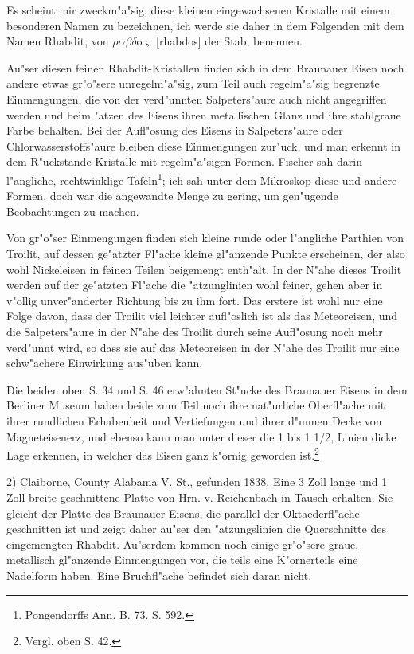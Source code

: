 \documentclass[a4paper, 11pt, oneside]{article}
\begin{document}
Es scheint mir zweckm"a"sig, diese kleinen eingewachsenen Kristalle mit einem besonderen Namen zu bezeichnen, ich werde sie daher in dem Folgenden mit dem Namen Rhabdit, von $\rho\alpha\beta\delta$o$\varsigma$ [rhabdos] der Stab, benennen.

Au"ser diesen feinen Rhabdit-Kristallen finden sich in dem Braunauer Eisen noch andere etwas gr"o"sere unregelm"a"sig, zum Teil auch regelm"a"sig begrenzte Einmengungen, die von der verd"unnten Salpeters"aure auch nicht angegriffen werden und beim "atzen des Eisens ihren metallischen Glanz und ihre stahlgraue Farbe behalten. Bei der Aufl"osung des Eisens in Salpeters"aure oder Chlorwasserstoffs"aure bleiben diese Einmengungen zur"uck, und man erkennt in dem R"uckstande Kristalle mit regelm"a"sigen Formen. Fischer sah darin l"angliche, rechtwinklige Tafeln\footnote{Pongendorffs Ann. B. 73. S. 592.}; ich sah unter dem Mikroskop diese und andere Formen, doch war die angewandte Menge zu gering, um gen"ugende Beobachtungen zu machen.

Von gr"o"ser Einmengungen finden sich kleine runde oder l"angliche Parthien von Troilit, auf dessen ge"atzter Fl"ache kleine gl"anzende Punkte erscheinen, der also wohl Nickeleisen in feinen Teilen beigemengt enth"alt. In der N"ahe dieses Troilit werden auf der ge"atzten Fl"ache die "atzunglinien wohl feiner, gehen aber in v"ollig unver"anderter Richtung bis zu ihm fort. Das erstere ist wohl nur eine Folge davon, dass der Troilit viel leichter aufl"oslich ist als das Meteoreisen, und die Salpeters"aure in der N"ahe des Troilit durch seine Aufl"osung noch mehr verd"unnt wird, so dass sie auf das Meteoreisen in der N"ahe des Troilit nur eine schw"achere Einwirkung aus"uben kann.

Die beiden oben S. 34 und S. 46 erw"ahnten St"ucke des Braunauer Eisens in dem Berliner Museum haben beide zum Teil noch ihre nat"urliche Oberfl"ache mit ihrer rundlichen Erhabenheit und Vertiefungen und ihrer d"unnen Decke von Magneteisenerz, und ebenso kann man unter dieser die 1 bis 1 1/2, Linien dicke Lage erkennen, in welcher das Eisen ganz k"ornig geworden ist.\footnote{Vergl. oben S. 42.}

2) Claiborne, County Alabama V. St., gefunden 1838. Eine 3 Zoll lange und 1 Zoll breite geschnittene Platte von Hrn. v. Reichenbach in Tausch erhalten. Sie gleicht der Platte des Braunauer Eisens, die parallel der Oktaederfl"ache geschnitten ist und zeigt daher au"ser den "atzungslinien die Querschnitte des eingemengten Rhabdit. Au"serdem kommen noch einige gr"o"sere graue, metallisch gl"anzende Einmengungen vor, die teils eine K"ornerteils eine Nadelform haben. Eine Bruchfl"ache befindet sich daran nicht.
\end{document}
